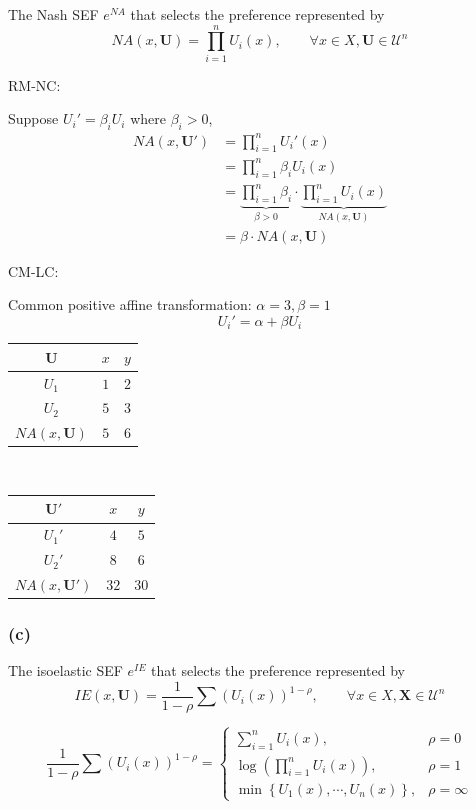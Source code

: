 \documentclass[a4paper]{article}
\begin{document}
The Nash SEF $e^{NA}$ that selects the preference represented by
\[NA(x,\mathbf{U})=\prod_{i=1}^{n} U_i(x), \qquad \forall x\in X, \mathbf{U}\in\mathscr{U}^{n} \]

RM-NC:

Suppose $U_i'=\beta_iU_i$ where $\beta_i>0$,
\begin{align*}
    NA(x,\mathbf{U}') &= \prod_{i=1}^{n}U_i'(x) \\
    &= \prod_{i=1}^{n}\beta_i U_i(x) \\
    &= \underbrace{\prod_{i=1}^{n}\beta_i}_{\beta>0} \cdot \underbrace{\prod_{i=1}^{n}U_i(x)}_{NA(x,\mathbf{U})} \\
    &= \beta \cdot NA(x,\mathbf{U})
\end{align*}

CM-LC:

Common positive affine transformation: $\alpha=3, \beta=1$
\[U_i'=\alpha + \beta U_i \]
\begin{table}[!htbp]
    \centering
    \begin{tabular}{c|cc|}
        $\mathbf{U}$ & $x$ & $y$              \\ 
        \hline
        $U_1$        & $1$ & $2$ \\
        $U_2$        & $5$ & $3$ \\
        \hline
        $NA(x,\mathbf{U})$ & $5$ & $6$ \\
    \end{tabular}
    $\qquad\qquad$
    \begin{tabular}{c|cc|}
        $\mathbf{U'}$ & $x$ & $y$              \\ 
        \hline
        $U_1'$        & $4$ & $5$ \\
        $U_2'$        & $8$ & $6$ \\
        \hline
        $NA(x,\mathbf{U}')$ & $32$ & $30$ \\
    \end{tabular}
\end{table}

\subsubsection*{(c)}

The isoelastic SEF $e^{IE}$ that selects the preference represented by
\[IE(x,\mathbf{U})=\frac{1}{1-\rho}\sum\left(U_i(x) \right)^{1-\rho},\qquad\forall x\in X,\mathbf{X}\in\mathscr{U}^{n} \]

\begin{equation*}
    \frac{1}{1-\rho}\sum\left(U_i(x) \right)^{1-\rho}=
    \begin{cases}
        \sum_{i=1}^{n}U_i(x), & \rho=0 \\
        \log \left(\prod_{i=1}^{n} U_i(x) \right), & \rho=1 \\
        \min\left\{U_1(x),\cdots, U_n(x) \right\}, & \rho=\infty
    \end{cases}
\end{equation*}
\end{document}
